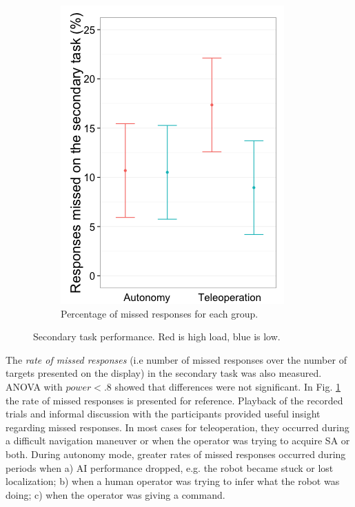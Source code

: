 \documentclass[a4paper,12pt,oneside,openright]{bhamthesis}
\begin{document}
\begin{figure}
\begin{subfigure}[b]{0.4\textwidth}
 		\includegraphics[width=\textwidth]{chapter3_fig/misses-cropped_pilot.png}
 		\caption{Percentage of missed responses for each group.}
 		\label{subfig:totalMissedRT_pilot}
 	\end{subfigure}
 	\hfill
 	\caption{Secondary task performance. Red is high load, blue is low.}
 	\label{fig:rt_pilot}
 \end{figure}

The \textit{rate of missed responses} (i.e number of missed responses over the number of targets presented on the display) in the secondary task was also measured. ANOVA with \textit{$power < .8$} showed that differences were not significant. In Fig. \ref{subfig:totalMissedRT_pilot} the rate of missed responses is presented for reference. Playback of the recorded trials and informal discussion with the participants provided useful insight regarding missed responses. In most cases for teleoperation, they occurred during a difficult navigation maneuver or when the operator was trying to acquire SA or both. During autonomy mode, greater rates of missed responses occurred during periods when a) AI performance dropped, e.g. the robot became stuck or lost localization; b) when a human operator was trying to infer what the robot was doing; c) when the operator was giving a command.
\end{document}
